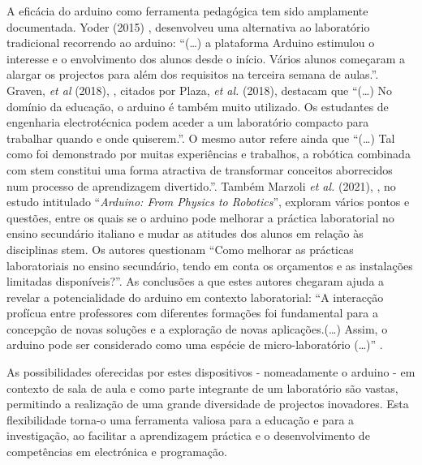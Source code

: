 A eficácia do \gls{arduino} como ferramenta pedagógica tem sido amplamente documentada. Yoder (2015) \cite{yoder}, desenvolveu uma alternativa ao laboratório tradicional recorrendo ao \gls{arduino}: ``(\dots) a plataforma Arduino estimulou o interesse e o envolvimento dos alunos desde o início. Vários alunos começaram a alargar os projectos para além dos requisitos na terceira semana de aulas.''. Graven, \textit{et al} (2018), \cite{graven}, citados por Plaza, \textit{et al.} (2018), \cite{plaza} destacam que ``(\ldots) No domínio da educação, o \gls{arduino} é também muito utilizado. Os estudantes de engenharia electrotécnica podem aceder a um laboratório compacto para trabalhar quando e onde quiserem.''. O mesmo autor refere ainda que ``(\ldots) Tal como foi demonstrado por muitas experiências e trabalhos, a robótica combinada com \acrshort{stem} constitui uma forma atractiva de transformar conceitos aborrecidos num processo de aprendizagem divertido.''. Também Marzoli \textit{et al.} (2021), \cite{Marzoli}, no estudo intitulado ``\textit{Arduino: From Physics to Robotics}'', exploram vários pontos e questões, entre os quais se o \gls{arduino} pode melhorar a práctica laboratorial no ensino secundário italiano e mudar as atitudes dos alunos em relação às disciplinas \acrshort{stem}. Os autores questionam ``Como melhorar as prácticas laboratoriais no ensino secundário, tendo em conta os orçamentos e as instalações limitadas disponíveis?''. As conclusões a que estes autores chegaram ajuda a revelar a potencialidade do \gls{arduino} em contexto laboratorial: ``A interacção profícua entre professores com diferentes formações foi fundamental para a concepção de novas soluções e a exploração de novas aplicações.(\ldots) Assim, o \gls{arduino} pode ser considerado como uma espécie de micro-laboratório (\ldots)'' \cite{Marzoli}.

As possibilidades oferecidas por estes dispositivos - nomeadamente o \gls{arduino} - em contexto de sala de aula e como parte integrante de um laboratório são vastas, permitindo a realização de uma grande diversidade de projectos inovadores. Esta flexibilidade torna-o uma ferramenta valiosa para a educação e para a investigação, ao facilitar a aprendizagem práctica e o desenvolvimento de competências em electrónica e programação.

